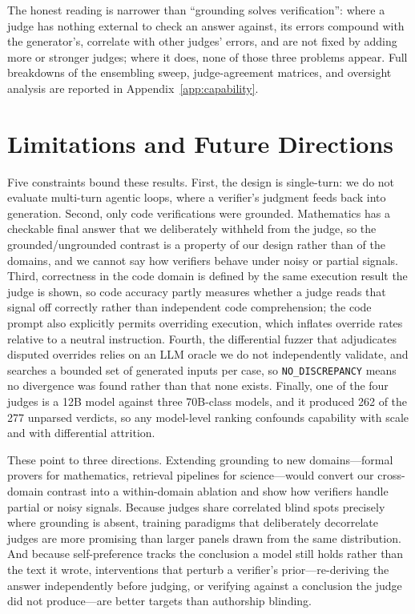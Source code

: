\documentclass{article}
\begin{document}
The honest reading is narrower than ``grounding solves verification'': where a judge
has nothing external to check an answer against, its errors compound with the
generator's, correlate with other judges' errors, and are not fixed by adding more or
stronger judges; where it does, none of those three problems appear. Full breakdowns
of the ensembling sweep, judge-agreement matrices, and oversight analysis are reported
in Appendix~\ref{app:capability}.

\FloatBarrier



\section{Limitations and Future Directions}
\label{sec:limitations}

Five constraints bound these results. First, the design is single-turn: we do not evaluate
multi-turn agentic loops, where a verifier's judgment feeds back into generation. Second,
only code verifications were grounded. Mathematics has a checkable final answer that we
deliberately withheld from the judge, so the grounded/ungrounded contrast is a property of
our design rather than of the domains, and we cannot say how verifiers behave under noisy
or partial signals. Third, correctness in the code domain is defined by the same execution
result the judge is shown, so code accuracy partly measures whether a judge reads that
signal off correctly rather than independent code comprehension; the code prompt also
explicitly permits overriding execution, which inflates override rates relative to a
neutral instruction. Fourth, the differential fuzzer that adjudicates disputed overrides
relies on an LLM oracle we do not independently validate, and searches a bounded set of
generated inputs per case, so \texttt{NO\_DISCREPANCY} means no divergence was found rather
than that none exists. Finally, one of the four judges is a 12B model against three
70B-class models, and it produced 262 of the 277 unparsed verdicts, so any model-level
ranking confounds capability with scale and with differential attrition.

These point to three directions. Extending grounding to new domains---formal provers for
mathematics, retrieval pipelines for science---would convert our cross-domain contrast into
a within-domain ablation and show how verifiers handle partial or noisy signals. Because
judges share correlated blind spots precisely where grounding is absent, training paradigms
that deliberately decorrelate judges are more promising than larger panels drawn from the
same distribution. And because self-preference tracks the conclusion a model still holds
rather than the text it wrote, interventions that perturb a verifier's prior---re-deriving
the answer independently before judging, or verifying against a conclusion the judge did
not produce---are better targets than authorship blinding.
\end{document}
